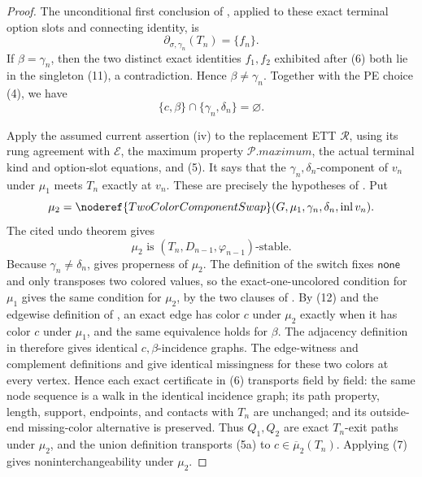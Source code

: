 \begin{proof}
The unconditional first conclusion of
, applied to these exact terminal
option slots and connecting identity, is
\[
           \partial_{\sigma,\gamma_n}(T_n)=\{f_n\}.          \tag{11}
\]
If \(\beta=\gamma_n\), then the two distinct exact identities
\(f_1,f_2\) exhibited after (6) both lie in the singleton (11), a
contradiction.  Hence \(\beta\ne\gamma_n\).  Together with the PE choice
(4), we have
\[
                    \{c,\beta\}\cap
                    \{\gamma_n,\delta_n\}=\varnothing.       \tag{12}
\]

Apply the assumed current assertion (iv) to the replacement ETT
\(\mathcal R\), using its rung agreement with \(\mathcal E\), the
maximum property \(\mathcal P.\mathit{maximum}\), the actual terminal
kind and option-slot equations, and (5).  It says that the
\(\gamma_n,\delta_n\)-component of \(v_n\) under \(\mu_1\) meets
\(T_n\) exactly at \(v_n\).  These are precisely the hypotheses of
.  Put
\[
 \mu_2=\noderef{TwoColorComponentSwap}
          (G,\mu_1,\gamma_n,\delta_n,\operatorname{inl}v_n).
\]
The cited undo theorem gives
\[
 \mu_2\text{ is }(T_n,D_{n-1},\varphi_{n-1})\text{-stable}.  \tag{13}
\]
Because \(\gamma_n\ne\delta_n\),
 gives properness of \(\mu_2\).
The definition of the switch fixes \(\mathsf{none}\) and only transposes
two colored values, so the exact-one-uncolored condition for \(\mu_1\)
gives the same condition for \(\mu_2\), by the two clauses of
.  By (12) and the edgewise definition of
, an exact edge has color \(c\) under
\(\mu_2\) exactly when it has color \(c\) under \(\mu_1\), and the same
equivalence holds for \(\beta\).  The adjacency definition in
 therefore gives identical
\(c,\beta\)-incidence graphs.  The edge-witness and complement definitions
 and  give identical
missingness for these two colors at every vertex.  Hence each exact
certificate in (6) transports field by field: the same node sequence is
a walk in the identical incidence graph; its path property, length,
support, endpoints, and contacts with \(T_n\) are unchanged; and its
outside-end missing-color alternative is preserved.  Thus \(Q_1,Q_2\)
are exact \(T_n\)-exit paths under \(\mu_2\), and the union definition
 transports (5a) to
\(c\in\overline{\mu}_2(T_n)\).  Applying (7) gives noninterchangeability
under \(\mu_2\).


\end{proof}
